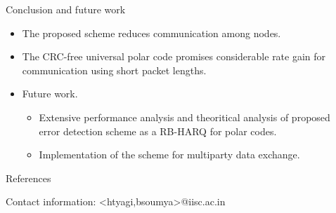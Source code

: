 \documentclass[final,hyperref={pdfpagelabels=false}]{beamer}
\begin{document}
\begin{frame}[t]
\begin{columns}[t]
\begin{column}{.465\textwidth}
\begin{block}{Conclusion and future work}
\begin{itemize}
\color{tacream}
\item The proposed scheme reduces communication among nodes.
\item The CRC-free universal polar code promises considerable rate gain for communication using short packet lengths.
\end{itemize}
\begin{itemize}
\item Future work.
\begin{itemize}
\item Extensive performance analysis and theoritical analysis of proposed error detection scheme as a RB-HARQ for polar codes.
\item Implementation of the scheme for multiparty data exchange.
\end{itemize}
\end{itemize}
\end{block}

\begin{block}{References}
        
\nocite{*} %
\small{


}
\end{block}
\begin{block}{Contact information: \textless htyagi,bsoumya\textgreater @iisc.ac.in}

\end{block}

\end{column} %

\begin{column}{.015\textwidth}\end{column} %

\end{columns} %

\end{frame} %
\end{document}

